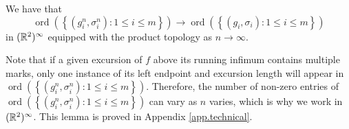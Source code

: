 \begin{lemma}\label{lemma.extractexcursions}
We have that 
$$\operatorname{ord}\left(\left\{(g_i^n,\sigma_i^n):1\leq i \leq m\right\}\right)\to \operatorname{ord}\left(\left\{(g_i,\sigma_i):1\leq i \leq m\right\}\right)$$
in $({\mathbb R}^{2})^\infty$ equipped with the product topology as $n\to \infty$. 
\end{lemma}
Note that if a given excursion of $f$ above its running infimum contains multiple marks, only one instance of its left endpoint and excursion length will appear in $\operatorname{ord}\left(\left\{(g_i^n,\sigma_i^n):1\leq i \leq m\right\}\right)$. Therefore, the number of non-zero entries of $\operatorname{ord}\left(\left\{(g_i^n,\sigma_i^n):1\leq i \leq m\right\}\right)$ can vary as $n$ varies, which is why we work in  $({\mathbb R}^{2})^\infty$. This lemma is proved in Appendix \ref{app.technical}. 

